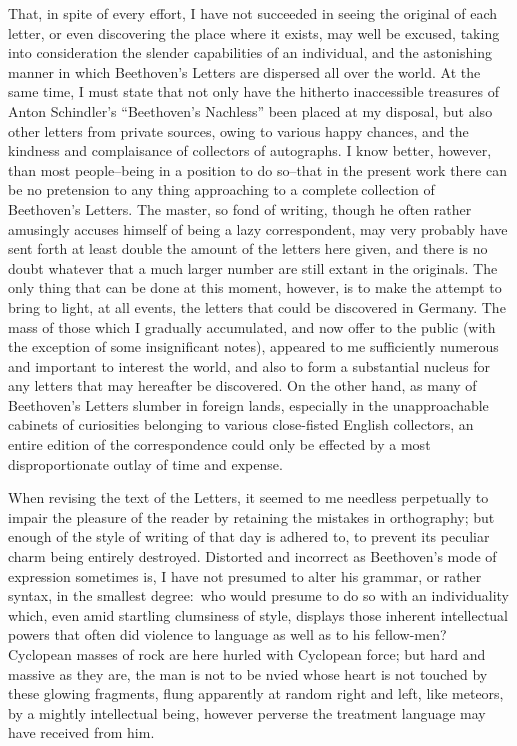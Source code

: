 \documentclass[12pt,oneside]{book}
\begin{document}
That, in spite of every effort, I have not succeeded in seeing the original of each letter, or even discovering
the place where it exists, may well be excused, taking into consideration the slender capabilities of an individual,
and the astonishing manner in which Beethoven's Letters are dispersed all over the world. At the same time, I must state that not only have 
the hitherto inaccessible treasures of Anton Schindler's ``Beethoven's Nachless'' been placed at my disposal,
but also other letters from private sources, owing to various happy chances, and the kindness and complaisance of 
collectors of autographs. I know better, however, than most people--being in a position to do so--that in the 
present work there can be no pretension to any thing approaching to a complete collection of Beethoven's Letters.
The master, so fond of writing, though he often rather amusingly accuses himself of being a lazy correspondent, 
may very probably have sent forth at least double the amount of the letters here given, and there is no doubt whatever 
that a much larger number are still extant in the originals. The only thing that can be done at this moment, however,
is to make the attempt to bring to light, at all events, the letters that could be discovered in Germany. The mass 
of those which I gradually accumulated, and now offer to the public (with the exception of some insignificant notes), 
appeared to me sufficiently numerous and important to interest the world, and also to form a substantial nucleus for
any letters that may hereafter be discovered. On the other hand, as many of Beethoven's Letters slumber in foreign lands,
especially in the unapproachable cabinets of curiosities belonging to various close-fisted English collectors, an entire 
edition of the correspondence could only be effected by a most disproportionate outlay of time and expense. \par 

When revising the text of the Letters, it seemed to me needless perpetually to impair the pleasure of the reader
by retaining the mistakes in orthography; but enough of the style of writing of that day is adhered to, to prevent 
its peculiar charm being entirely destroyed. Distorted and incorrect as Beethoven's mode of expression sometimes is,
I have not presumed to alter his grammar, or rather syntax, in the smallest degree:~who would presume to do so with
an individuality which, even amid startling clumsiness of style, displays those inherent intellectual powers 
that often did violence to language as well as to his fellow-men? Cyclopean masses of rock are here hurled with 
Cyclopean force; but hard and massive as they are, the man is not to be nvied whose heart is not touched by these glowing 
fragments, flung apparently at random right and left, like meteors, by a mightly intellectual being, however perverse 
the treatment language may have received from him. \par 
\end{document}
